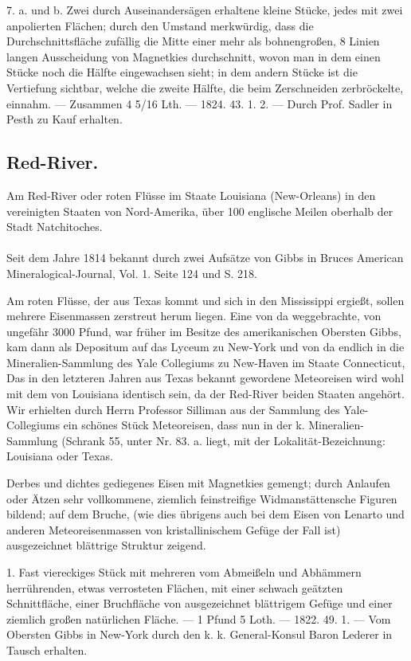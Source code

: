 \documentclass[a4paper, 11pt, oneside, polutonikogreek, german]{article}
\begin{document}
7. a. und b. Zwei durch Auseinandersägen erhaltene kleine Stücke, jedes mit zwei anpolierten Flächen; durch den Umstand merkwürdig, dass die Durchschnittsfläche zufällig die Mitte einer mehr als bohnengroßen, 8 Linien langen Ausscheidung von Magnetkies durchschnitt, wovon man in dem einen Stücke noch die Hälfte eingewachsen sieht; in dem andern Stücke ist die Vertiefung sichtbar, welche die zweite Hälfte, die beim Zerschneiden zerbröckelte, einnahm. — Zusammen 4 5/16 Lth. — 1824. 43. 1. 2. — Durch Prof. Sadler in Pesth zu Kauf erhalten.
\subsection{Red-River.}
\begin{center}
\small
Am Red-River oder roten Flüsse im Staate Louisiana (New-Orleans) in den vereinigten Staaten von Nord-Amerika, über 100 englische Meilen oberhalb der Stadt Natchitoches.
\end{center}
\paragraph{}
Seit dem Jahre 1814 bekannt durch zwei Aufsätze von Gibbs in Bruces American Mineralogical-Journal, Vol. 1. Seite 124 und S. 218.

Am roten Flüsse, der aus Texas kommt und sich in den Mississippi ergießt, sollen mehrere Eisenmassen zerstreut herum liegen. Eine von da weggebrachte, von ungefähr 3000 Pfund, war früher im Besitze des amerikanischen Obersten Gibbs, kam dann als Depositum auf das Lyceum zu New-York und von da endlich in die Mineralien-Sammlung des Yale Collegiums zu New-Haven im Staate Connecticut, Das in den letzteren Jahren aus Texas bekannt gewordene Meteoreisen wird wohl mit dem von Louisiana identisch sein, da der Red-River beiden Staaten angehört. Wir erhielten durch Herrn Professor Silliman aus der Sammlung des Yale-Collegiums ein schönes Stück Meteoreisen, dass nun in der k. Mineralien-Sammlung (Schrank 55, unter Nr. 83. a. liegt, mit der Lokalität-Bezeichnung: Louisiana oder Texas.

Derbes und dichtes gediegenes Eisen mit Magnetkies gemengt; durch Anlaufen oder Ätzen sehr vollkommene, ziemlich feinstreifige Widmanstättensche Figuren bildend; auf dem Bruche, (wie dies übrigens auch bei dem Eisen von Lenarto und anderen Meteoreisenmassen von kristallinischem Gefüge der Fall ist) ausgezeichnet blättrige Struktur zeigend.

1. Fast viereckiges Stück mit mehreren vom Abmeißeln und Abhämmern herrührenden, etwas verrosteten Flächen, mit einer schwach geätzten Schnittfläche, einer Bruchfläche von ausgezeichnet blättrigem Gefüge und einer ziemlich großen natürlichen Fläche. — 1 Pfund 5 Loth. — 1822. 49. 1. — Vom Obersten Gibbs in New-York durch den k. k. General-Konsul Baron Lederer in Tausch erhalten.
\end{document}
